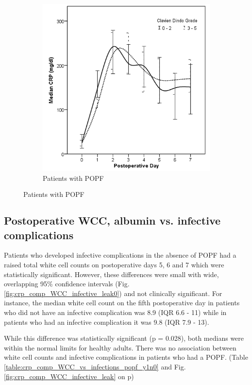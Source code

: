 \begin{figure}[t]
\begin{subfigure}{0.48\textwidth}
		\includegraphics[width=\textwidth]{Figures/crp_comp_infective_leak1}
		\caption{Patients with POPF}
		\label{fig:crp_comp_infective_leak1}
	\end{subfigure}
\end{figure}
\vfill

\clearpage

\subsection{Postoperative WCC, albumin vs. infective complications}

Patients who developed infective complications in the absence of POPF had a raised total white cell counts on postoperative days 5, 6 and 7 which were statistically significant.
However, these differences were small with wide, overlapping 95\% confidence intervals (Fig. \ref{fig:crp_comp_WCC_infective_leak0}) and not clinically significant. 
For instance, the median white cell count on the fifth postoperative day in patients who did not have an infective complication was 8.9 (IQR 6.6 - 11) while in patients who had an infective complication it was 9.8 (IQR 7.9 - 13). 

While this difference was statistically significant (p = 0.028), both medians were within the normal limits for healthy adults. 
There was no association between white cell counts and infective complications in patients who had a POPF. (Table \ref{table:crp_comp_WCC_vs_infections_popf_y1n0} and Fig. \ref{fig:crp_comp_WCC_infective_leak} on p\pageref{fig:crp_comp_WCC_infective_leak})

